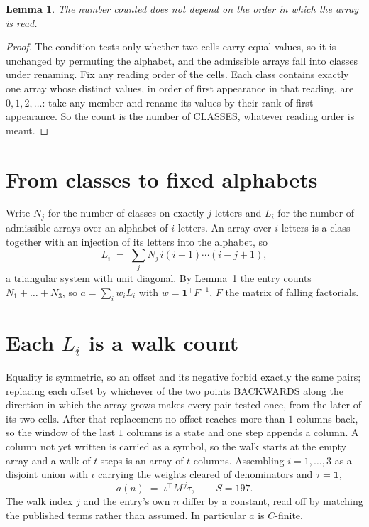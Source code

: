 \documentclass[11pt,a4paper]{article}
\theoremstyle{plain}
\newtheorem{lemma}[theorem]{Lemma}
\theoremstyle{definition}
\begin{document}
\begin{lemma}\label{lem:order}
The number counted does not depend on the order in which the array is read.
\end{lemma}

\begin{proof}
The condition tests only whether two cells carry equal values, so it is unchanged by permuting
the alphabet, and the admissible arrays fall into classes under renaming. Fix any reading order
of the cells. Each class contains exactly one array whose distinct values, in order of first
appearance in that reading, are $0,1,2,\dots$: take any member and rename its values by their
rank of first appearance. So the count is the number of CLASSES, whatever reading order is
meant.
\end{proof}

\section{From classes to fixed alphabets}

Write $N_j$ for the number of classes on exactly $j$ letters and $L_i$ for the number of
admissible arrays over an alphabet of $i$ letters. An array over $i$ letters is a class together
with an injection of its letters into the alphabet, so
\[
L_i\;=\;\sum_j N_j\,i(i-1)\cdots(i-j+1),
\]
a triangular system with unit diagonal. By Lemma~\ref{lem:order} the entry counts
$N_1+\dots+N_{3}$, so $a=\sum_i w_iL_i$ with $w=\mathbf{1}^{\!\top}F^{-1}$, $F$ the
matrix of falling factorials.

\section{Each $L_i$ is a walk count}

Equality is symmetric, so an offset and its negative forbid exactly the same pairs; replacing
each offset by whichever of the two points BACKWARDS along the direction in which the array
grows makes every pair tested once, from the later of its two cells. After that replacement no
offset reaches more than $1$ columns back, so the window of the last $1$
columns is a state and one step appends a column. A column not yet written is
carried as a symbol, so the walk starts at the empty array and a walk of $t$ steps is an array
of $t$ columns. Assembling $i=1,\dots,3$ as a disjoint union with $\iota$ carrying the
weights cleared of denominators and $\tau=\mathbf{1}$,
\[
a(n)\;=\;\iota^{\!\top}M^{\,j}\tau ,\qquad S=197.
\]
The walk index $j$ and the entry's own $n$ differ by a constant, read off by matching the
published terms rather than assumed. In particular $a$ is $C$-finite.
\end{document}
